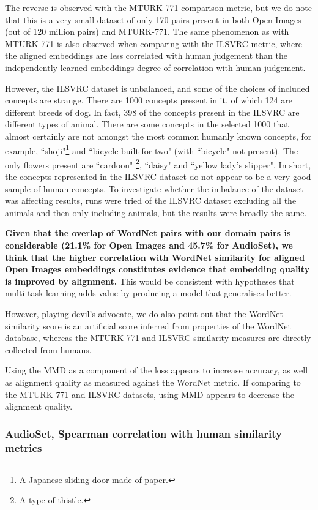 The reverse is observed with the MTURK-771 comparison metric, but we do note that this is a very small dataset of only 170 pairs present in both Open Images (out of 120 million pairs) and MTURK-771. The same phenomenon as with MTURK-771 is also observed when comparing with the ILSVRC metric, where the aligned embeddings are less correlated with human judgement than the independently learned embeddings degree of correlation with human judgement. 

However, the ILSVRC dataset is unbalanced, and some of the choices of included concepts are strange. There are 1000 concepts present in it, of which 124 are different breeds of dog. In fact, 398 of the concepts present in the ILSVRC are different types of animal. There are some concepts in the selected 1000 that almost certainly are not amongst the most common humanly known concepts, for example, ``shoji"\footnote{A Japanese sliding door made of paper.} and ``bicycle-built-for-two" (with ``bicycle" not present). The only flowers present are ``cardoon" \footnote{A type of thistle.}, ``daisy" and ``yellow lady's slipper". In short, the concepts represented in the ILSVRC dataset do not appear to be a very good sample of human concepts. To investigate whether the imbalance of the dataset was affecting results, runs were tried of the ILSVRC dataset excluding all the animals and then only including animals, but the results were broadly the same. 

\textbf{Given that the overlap of WordNet pairs with our domain pairs is considerable (21.1\% for Open Images and 45.7\% for AudioSet), we think that the higher correlation with WordNet similarity for aligned Open Images embeddings constitutes evidence that embedding quality is improved by alignment.} This would be consistent with hypotheses that multi-task learning adds value by producing a model that generalises better.

However, playing devil's advocate, we do also point out that the WordNet similarity score is an artificial score inferred from properties of the WordNet database, whereas the MTURK-771 and  ILSVRC similarity measures are directly collected from humans. 

Using the MMD as a component of the loss appears to increase accuracy, as well as alignment quality as measured against the WordNet metric. If comparing to the MTURK-771 and ILSVRC datasets, using MMD appears to decrease the alignment quality.  

\subsubsection{AudioSet, Spearman correlation with human similarity metrics}

